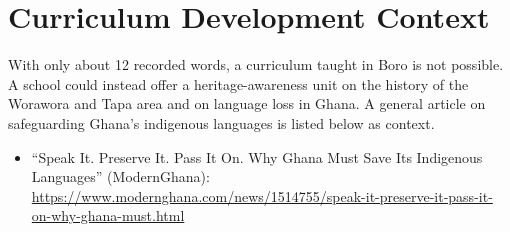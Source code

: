 \documentclass[12pt]{article}
\begin{document}
\section{Curriculum Development Context}
With only about 12 recorded words, a curriculum taught in Boro is not possible. A school could instead offer a heritage-awareness unit on the history of the Worawora and Tapa area and on language loss in Ghana. A general article on safeguarding Ghana's indigenous languages is listed below as context.
\begin{itemize}
\item ``Speak It. Preserve It. Pass It On. Why Ghana Must Save Its Indigenous Languages'' (ModernGhana): \url{https://www.modernghana.com/news/1514755/speak-it-preserve-it-pass-it-on-why-ghana-must.html}
\end{itemize}
\end{document}
